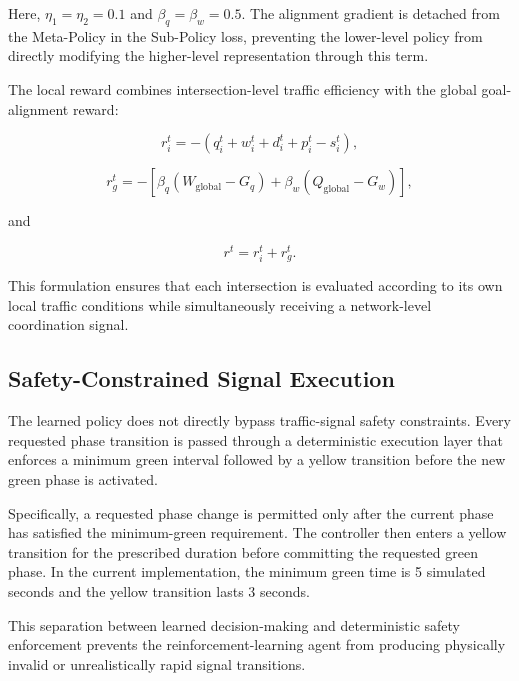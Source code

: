 \documentclass[3p,times]{elsarticle}
\theoremstyle{plain}
\theoremstyle{definition}
\begin{document}
Here, $\eta_1 = \eta_2 = 0.1$ and $\beta_q = \beta_w = 0.5$. The
alignment gradient is detached from the Meta-Policy in the Sub-Policy
loss, preventing the lower-level policy from directly modifying the
higher-level representation through this term.

The local reward combines intersection-level traffic efficiency with
the global goal-alignment reward:

\begin{equation}
r_i^t = -\left(q_i^t + w_i^t + d_i^t + p_i^t - s_i^t\right),
\end{equation}

\begin{equation}
r_g^t = -\left[\beta_q(W_{\mathrm{global}} - G_q) +
\beta_w(Q_{\mathrm{global}} - G_w)\right],
\end{equation}

and

\begin{equation}
r^t = r_i^t + r_g^t.
\end{equation}

This formulation ensures that each intersection is evaluated according
to its own local traffic conditions while simultaneously receiving a
network-level coordination signal.


\subsection{Safety-Constrained Signal Execution}\label{subsec3-9}

The learned policy does not directly bypass traffic-signal safety
constraints. Every requested phase transition is passed through a
deterministic execution layer that enforces a minimum green interval
followed by a yellow transition before the new green phase is
activated.

Specifically, a requested phase change is permitted only after the
current phase has satisfied the minimum-green requirement. The
controller then enters a yellow transition for the prescribed duration
before committing the requested green phase. In the current
implementation, the minimum green time is 5 simulated seconds and the
yellow transition lasts 3 seconds.

This separation between learned decision-making and
deterministic safety enforcement prevents the reinforcement-learning
agent from producing physically invalid or unrealistically rapid
signal transitions.
\end{document}
